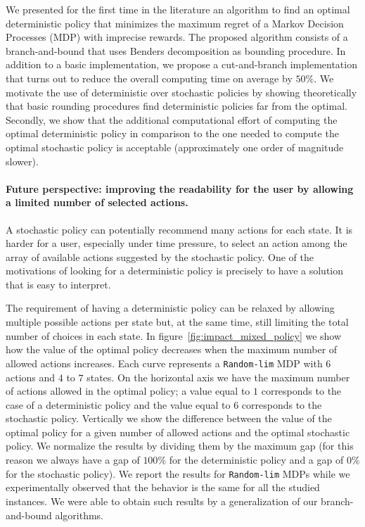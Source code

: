 We presented for the first time in the literature an algorithm to find an optimal deterministic policy that minimizes the maximum regret of a Markov Decision Processes (MDP) with imprecise rewards.
The proposed algorithm consists of a branch-and-bound that uses Benders decomposition as bounding procedure. In addition to a basic implementation, we propose a cut-and-branch implementation that turns out to reduce the overall computing time on average by $50\%$.  
We motivate the use of deterministic over stochastic policies by showing theoretically that basic rounding procedures find deterministic policies far from the optimal. Secondly, we show that the additional computational effort of computing the optimal deterministic policy in comparison to the one needed to compute the optimal stochastic policy is acceptable (approximately one order of magnitude slower). 
\paragraph{Future perspective: improving the readability for the user by allowing a limited number of selected actions.}
A stochastic policy can potentially recommend many actions for each state. It is harder for a user, especially under time pressure, to select an action among the array of available actions suggested by the stochastic policy. 
%
One of the motivations of looking for a deterministic policy is precisely to have a solution that is easy to interpret.

The requirement of having a deterministic policy can be relaxed by allowing multiple possible actions per state but, at the same time, still limiting the total number of choices in each state.
%
In figure~\ref{fig:impact_mixed_policy} we show how the value of the optimal policy decreases when the maximum number of allowed actions increases. Each curve represents a \texttt{Random-lim} MDP with $6$ actions and $4$ to $7$ states. On the horizontal axis we have the maximum number of actions allowed in the optimal policy; a value equal to $1$ corresponds to the case of a deterministic policy and the value equal to $6$ corresponds to the stochastic policy. Vertically we show the difference between the value of the optimal policy for a given number of allowed actions and the optimal stochastic policy. We normalize the results by dividing them by the maximum gap (for this reason we always have a gap of $100\%$ for the deterministic policy and a gap of $0\%$ for the stochastic policy). We report the results for \texttt{Random-lim} MDPs while we experimentally observed that the behavior is the same for all the studied instances. We were able to obtain such results by a generalization of our branch-and-bound algorithms. 



